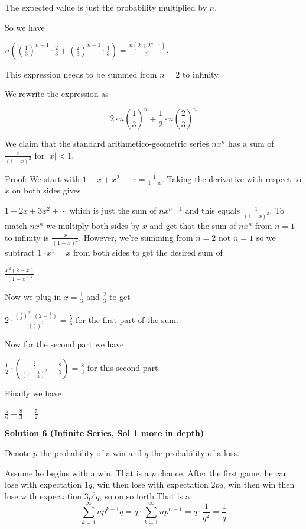 \begin{enumerate}
 The expected value is just the probability multiplied by $n$. 

 So we have

 $n((\frac{1}{3})^{n - 1} \cdot \frac{2}{3} + (\frac{2}{3})^{n - 1} \cdot \frac{1}{3}) = \frac{n(2 + 2^{n - 1})}{3^n}$. 

 This expression needs to be summed from $n = 2$ to infinity. 

 We rewrite the expression as 

 
 \[2 \cdot n(\frac{1}{3})^n + \frac{1}{2} \cdot n(\frac{2}{3})^{n}\]

 We claim that the standard arithmetico-geometric series $nx^n$ has a sum of $\frac{x}{(1 - x)^2}$ for $|x| < 1$. 

 Proof: We start with $1 + x + x^2 + \cdots = \frac{1}{1 - x}$. Taking the derivative with respect to $x$ on both sides gives

 $1 + 2x + 3x^2 + \cdots$ which is just the sum of $nx^{n - 1}$ and this equals $\frac{1}{(1 - x)^2}$. To match $nx^n$ we multiply both sides by $x$ and get that the sum of $nx^n$ from $n = 1$ to infinity is $\frac{x}{(1 - x)^2}$. However, we're summing from $n = 2$ not $n = 1$ so we subtract $1 \cdot x^1 = x$ from both sides to get the desired sum of

 $\frac{x^2(2 - x)}{(1 - x)^2}$

 Now we plug in $x = \frac{1}{3}$ and $\frac{2}{3}$ to get

 $2 \cdot \frac{(\frac{1}{3})^2 \cdot (2 - \frac{1}{3})}{(\frac{2}{3})^2} = \frac{5}{6}$ for the first part of the sum.

 Now for the second part we have

 $\frac{1}{2} \cdot (\frac{\frac{2}{3}}{(1 - \frac{2}{3})^2} - \frac{2}{3}) = \frac{8}{3}$ for this second part.

 Finally we have

 $\frac{5}{6} + \frac{8}{3} = \boxed{\frac{7}{2}}$




\textbf{Solution 6 (Infinite Series, Sol 1 more in depth)}

Denote $p$ the probability of a win and $q$ the probability of a loss. 

 Assume he begins with a win. That is a $p$ chance. After the first game, he can lose with expectation $1q$, win then lose with expectation $2pq$, win then win then lose with expectation $3p^2q$, so on so forth.That is a 
 \[\sum_{k=1}^{\infty} np^{k-1}q = q \cdot \sum_{k=1}^{\infty} np^{n-1} = q \cdot \frac{1}{q^2} = \frac{1}{q}\]


\end{enumerate}
